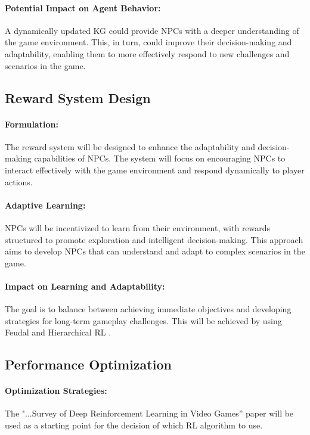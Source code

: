 \paragraph{Potential Impact on Agent Behavior:}
A dynamically updated KG could provide NPCs with a deeper understanding of the game environment. This, in turn, could improve their decision-making and adaptability, enabling them to more effectively respond to new challenges and scenarios in the game.

\subsection{Reward System Design}
\paragraph{Formulation:}
The reward system will be designed to enhance the adaptability and decision-making capabilities of NPCs. The system will focus on encouraging NPCs to interact effectively with the game environment and respond dynamically to player actions.

\paragraph{Adaptive Learning:}
NPCs will be incentivized to learn from their environment, with rewards structured to promote exploration and intelligent decision-making. This approach aims to develop NPCs that can understand and adapt to complex scenarios in the game.

\paragraph{Impact on Learning and Adaptability:}
The goal is to balance between achieving immediate objectives and developing strategies for long-term gameplay challenges. This will be achieved by using Feudal and Hierarchical RL \cite{Feudal_RL}.

\subsection{Performance Optimization}
\paragraph{Optimization Strategies:}
The "...Survey of Deep Reinforcement Learning in Video Games” paper will be used as a starting point for the decision of which RL algorithm to use.

